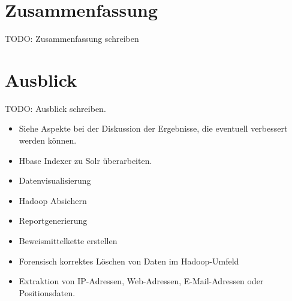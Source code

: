 \chapter{Zusammenfassung}
\label{ch:zusammenfassung}
TODO: Zusammenfassung schreiben


\chapter{Ausblick}
\label{ch:ausblick}
TODO: Ausblick schreiben.
\begin{itemize}
\item Siehe Aspekte bei der Diskussion der Ergebnisse, die eventuell verbessert werden können.
\item Hbase Indexer zu Solr überarbeiten.
\item Datenvisualisierung
\item Hadoop Absichern
\item Reportgenerierung
\item Beweismittelkette erstellen
\item Forensisch korrektes Löschen von Daten im Hadoop-Umfeld
\item Extraktion von IP-Adressen, Web-Adressen, E-Mail-Adressen oder Positionsdaten.
\end{itemize}
